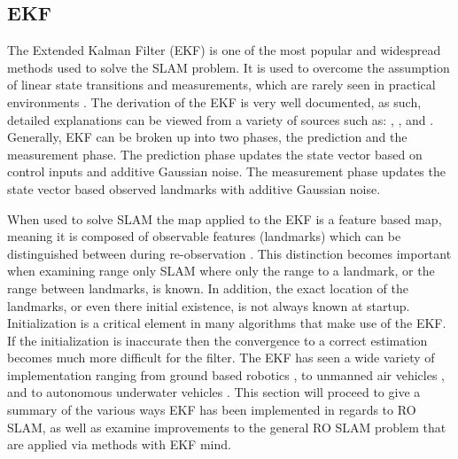 \documentclass[conference]{IEEEtran}
\begin{document}
	\subsection{EKF}
	
	
	
	The Extended Kalman Filter (EKF) is one of the most popular and widespread methods used to solve the SLAM problem. It is used to overcome the assumption of linear state transitions and measurements, which are rarely seen in practical environments \cite{Thrun2002}. The derivation of the EKF is very well documented, as such, detailed explanations can be viewed from a variety of sources such as: \cite{Thrun2002}, \cite{Ribeiro2004}, and \cite{Haykin2001}. Generally, EKF can be broken up into two phases, the prediction and the measurement phase. The prediction phase updates the state vector based on control inputs and additive Gaussian noise. The measurement phase updates the state vector based observed landmarks with additive Gaussian noise.
	
	 When used to solve SLAM the map applied to the EKF is a feature based map, meaning it is composed of observable features (landmarks) which can be distinguished between during re-observation \cite{Thrun2002}. This distinction becomes important when examining range only SLAM where only the range to a landmark, or the range between landmarks, is known. 
	 In addition, the exact location of the landmarks, or even there initial existence, is not always known at startup. Initialization is a critical element in many algorithms that make use of the EKF. If the initialization is inaccurate then the convergence to a correct estimation becomes much more difficult for the filter. The EKF has seen a wide variety of implementation ranging from ground based robotics\cite{Djugash2008} \cite{Shue2017}, to unmanned air vehicles \cite{Fabresse2016}, and to autonomous underwater vehicles \cite{Olson2006}. This section will proceed to give a summary of the various ways EKF has been implemented in regards to RO SLAM, as well as examine improvements to the general RO SLAM problem that are applied via methods with EKF mind.
	
	
	
\end{document}
